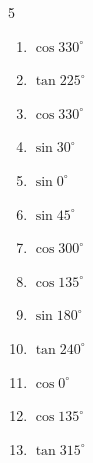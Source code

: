 \begin{multicols}{5}
\begin{enumerate}
  \item $\displaystyle \cos{330^\circ}$


  \item $\displaystyle \tan{225^\circ}$

        \phantom{$\displaystyle =1$}

  \item $\displaystyle \cos{330^\circ}$


  \item $\displaystyle \sin{30^\circ}$


  \item $\displaystyle \sin{0^\circ}$

        \phantom{$\displaystyle =0$}

  \item $\displaystyle \sin{45^\circ}$


  \item $\displaystyle \cos{300^\circ}$


  \item $\displaystyle \cos{135^\circ}$


  \item $\displaystyle \sin{180^\circ}$

        \phantom{$\displaystyle =0$}

  \item $\displaystyle \tan{240^\circ}$


\columnbreak %

  \item $\displaystyle \cos{0^\circ}$

        \phantom{$\displaystyle =1$}

  \item $\displaystyle \cos{135^\circ}$


  \item $\displaystyle \tan{315^\circ}$


\end{enumerate}
\end{multicols}
